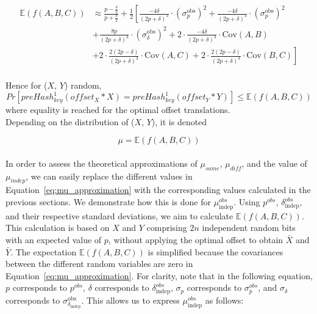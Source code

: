 \begin{equation}
    \begin{aligned}
    \mathbb{E}(f(A,B,C)) &\approx \frac{p - \frac{\delta}{2}}{p + \frac{\delta}{2}} + \frac{1}{2} \left[ \frac{-4\delta}{(2p + \delta)^3}\cdot({\sigma^\text{obs}_p})^2 + \frac{-4\delta}{(2p + \delta)^3}\cdot({\sigma^\text{obs}_p})^2 \right. \\[2mm]
    & \left. + \frac{8p}{(2p + \delta)^3}\cdot({\sigma^\text{obs}_\delta})^2 + 2\cdot\frac{-4\delta}{(2p + \delta)^3}\cdot\text{Cov}(A,B) \right. \\[2mm]
    & \left. + 2\cdot\frac{2(2p - \delta)}{(2p + \delta)^3}\cdot\text{Cov}(A,C) + 2\cdot\frac{2(2p - \delta)}{(2p + \delta)^3}\cdot\text{Cov}(B,C) \right]\\
    \end{aligned}
    \label{eq:mu_approximation}
\end{equation}

Hence for (\(X\), \(Y\)) random,
\begin{equation}
    \label{eq:mu_leq}
    Pr[preHash_{key}^1(offset_X * X) = preHash_{key}^1(offset_Y * Y)] \leq \mathbb{E}(f(A,B,C))
\end{equation}
where equality is reached for the optimal offset translations.\\

Depending on the distribution of (\(X\), \(Y\)), it is denoted

\begin{equation} \label{eq:mu}
    \mu = \mathbb{E}(f(A,B,C))
\end{equation}\\

In order to assess the theoretical approximations of $\mu_{same}$, $\mu_{diff}$, and the value of $\mu_{indep}$, we can easily replace the different values in Equation~\ref{eq:mu_approximation} with the corresponding values calculated in the previous sections. We demonstrate how this is done for \( \mu_{\text{indep}}^{obs} \). Using \( p^{obs} \), \(\delta_{\text{indep}}^{obs}\), and their respective standard deviations, we aim to calculate \(\mathbb{E}(f(A,B,C))\). This calculation is based on \(X\) and \(Y\) comprising \(2n\) independent random bits with an expected value of \(p\), without applying the optimal offset to obtain \(\bar{X}\) and \(\bar{Y}\). The expectation \(\mathbb{E}(f(A,B,C))\) is simplified because the covariances between the different random variables are zero in Equation~\ref{eq:mu_approximation}. For clarity, note that in the following equation, \(p\) corresponds to \(p^{obs}\), \(\delta\) corresponds to \(\delta_{\text{indep}}^{obs}\), \(\sigma_p\) corresponds to \(\sigma_p^{obs}\), and \(\sigma_\delta\) corresponds to \(\sigma_{\delta_{\text{indep}}}^{\text{obs}}\). This allows us to express \( \mu_{\text{indep}}^{obs} \) as follows:

